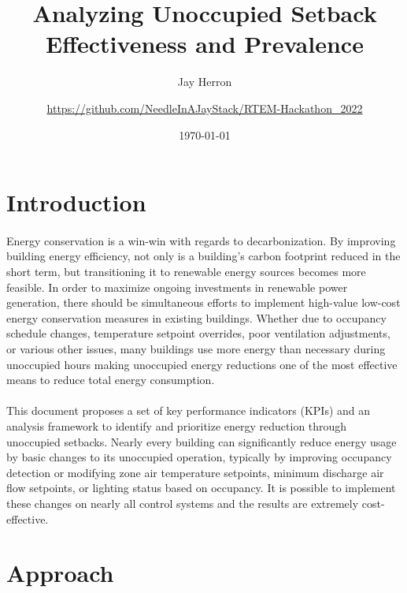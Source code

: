 \documentclass[a4paper]{article}
\begin{document}
\begin{titlepage}
\title{Analyzing Unoccupied Setback Effectiveness and Prevalence}
\author{
	Jay Herron
	\and
	\url{https://github.com/NeedleInAJayStack/RTEM-Hackathon\_2022}
}
\date{\today}
\maketitle
\end{titlepage}

\section{Introduction}

\paragraph{}
Energy conservation is a win-win with regards to decarbonization. By improving building energy efficiency, not only is a building's carbon footprint reduced in the short term, but transitioning it to renewable energy sources becomes more feasible. In order to maximize ongoing investments in renewable power generation, there should be simultaneous efforts to implement high-value low-cost energy conservation measures in existing buildings. Whether due to occupancy schedule changes, temperature setpoint overrides, poor ventilation adjustments, or various other issues, many buildings use more energy than necessary during unoccupied hours making unoccupied energy reductions one of the most effective means to reduce total energy consumption.

\paragraph{}
This document proposes a set of key performance indicators (KPIs) and an analysis framework to identify and prioritize energy reduction through unoccupied setbacks. Nearly every building can significantly reduce energy usage by basic changes to its unoccupied operation, typically by improving occupancy detection or modifying zone air temperature setpoints, minimum discharge air flow setpoints, or lighting status based on occupancy. It is possible to implement these changes on nearly all control systems and the results are extremely cost-effective.

\section{Approach}
\end{document}
